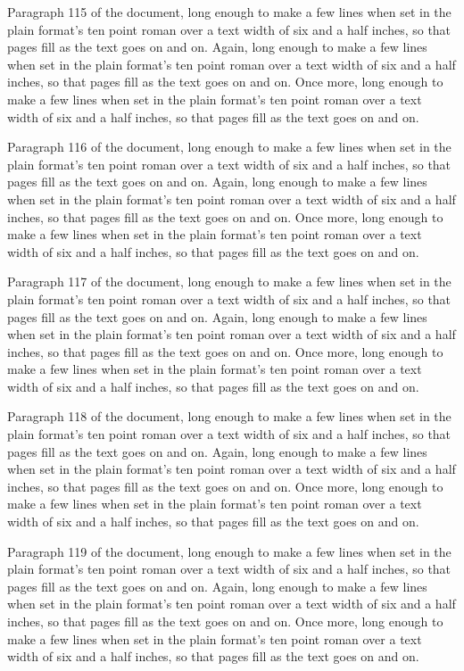 Paragraph 115 of the document, long enough to make a few lines when set in the plain format's ten point roman over a text width of six and a half inches, so that pages fill as the text goes on and on. Again, long enough to make a few lines when set in the plain format's ten point roman over a text width of six and a half inches, so that pages fill as the text goes on and on. Once more, long enough to make a few lines when set in the plain format's ten point roman over a text width of six and a half inches, so that pages fill as the text goes on and on.

Paragraph 116 of the document, long enough to make a few lines when set in the plain format's ten point roman over a text width of six and a half inches, so that pages fill as the text goes on and on. Again, long enough to make a few lines when set in the plain format's ten point roman over a text width of six and a half inches, so that pages fill as the text goes on and on. Once more, long enough to make a few lines when set in the plain format's ten point roman over a text width of six and a half inches, so that pages fill as the text goes on and on.

Paragraph 117 of the document, long enough to make a few lines when set in the plain format's ten point roman over a text width of six and a half inches, so that pages fill as the text goes on and on. Again, long enough to make a few lines when set in the plain format's ten point roman over a text width of six and a half inches, so that pages fill as the text goes on and on. Once more, long enough to make a few lines when set in the plain format's ten point roman over a text width of six and a half inches, so that pages fill as the text goes on and on.

Paragraph 118 of the document, long enough to make a few lines when set in the plain format's ten point roman over a text width of six and a half inches, so that pages fill as the text goes on and on. Again, long enough to make a few lines when set in the plain format's ten point roman over a text width of six and a half inches, so that pages fill as the text goes on and on. Once more, long enough to make a few lines when set in the plain format's ten point roman over a text width of six and a half inches, so that pages fill as the text goes on and on.

Paragraph 119 of the document, long enough to make a few lines when set in the plain format's ten point roman over a text width of six and a half inches, so that pages fill as the text goes on and on. Again, long enough to make a few lines when set in the plain format's ten point roman over a text width of six and a half inches, so that pages fill as the text goes on and on. Once more, long enough to make a few lines when set in the plain format's ten point roman over a text width of six and a half inches, so that pages fill as the text goes on and on.

